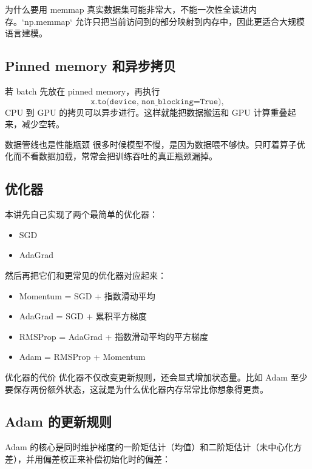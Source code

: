 \documentclass[a4paper]{article}
\begin{document}
\begin{knowledgebox}{为什么要用 memmap}
真实数据集可能非常大，不能一次性全读进内存。`np.memmap` 允许只把当前访问到的部分映射到内存中，因此更适合大规模语言建模。
\end{knowledgebox}

\subsection{Pinned memory 和异步拷贝}

若 batch 先放在 pinned memory，再执行
\[
\texttt{x.to(device, non\_blocking=True)},
\]
CPU 到 GPU 的拷贝可以异步进行。这样就能把数据搬运和 GPU 计算重叠起来，减少空转。

\begin{warningbox}{数据管线也是性能瓶颈}
很多时候模型不慢，是因为数据喂不够快。只盯着算子优化而不看数据加载，常常会把训练吞吐的真正瓶颈漏掉。
\end{warningbox}

\subsection{优化器}

本讲先自己实现了两个最简单的优化器：
\begin{itemize}
    \item SGD
    \item AdaGrad
\end{itemize}

然后再把它们和更常见的优化器对应起来：
\begin{itemize}
    \item Momentum = SGD + 指数滑动平均
    \item AdaGrad = SGD + 累积平方梯度
    \item RMSProp = AdaGrad + 指数滑动平均的平方梯度
    \item Adam = RMSProp + Momentum
\end{itemize}

\begin{knowledgebox}{优化器的代价}
优化器不仅改变更新规则，还会显式增加状态量。比如 Adam 至少要保存两份额外状态，这就是为什么优化器内存常常比你想象得更贵。
\end{knowledgebox}

\subsection{Adam 的更新规则}

Adam 的核心是同时维护梯度的一阶矩估计（均值）和二阶矩估计（未中心化方差），并用偏差校正来补偿初始化时的偏差：
\end{document}

